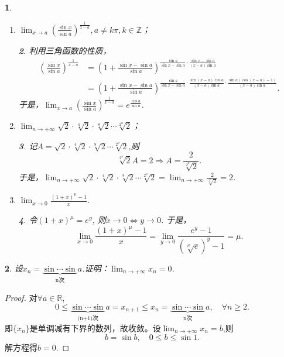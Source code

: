 \documentclass[utf8]{book}
\newtheorem{example}{}[section]             %
\newtheorem{solution}{}
\begin{document}
\begin{example}
\begin{enumerate}
\begin{solution}
\begin{equation*}
\begin{split}
&=\displaystyle\lim_{x\to 0}(1+2(e^{\frac{x}{1+x}}-1))^{\frac{1}{2(e^{\frac{x}{1+x}}-1)}\frac{2(e^{\frac{x}{1+x}}-1)}{\frac{x}{1+x}}\left(\frac{x^2+1}{1+x}\right)}\\
&=e^2
\end{split}
\end{equation*}
\end{solution}
\item $\displaystyle\lim_{x\to a}\left(\frac{\sin{x}}{\sin{a}}\right)^{\frac{1}{x-a}}, a\neq k\pi,k\in\mathbb{Z}$；
\begin{solution}利用三角函数的性质，
\begin{equation*}
\begin{split}
\left(\frac{\sin{x}}{\sin{a}}\right)^{\frac{1}{x-a}}&=\left(1+\frac{\sin{x}-\sin{a}}{\sin{a}}\right)^{\frac{\sin{a}}{\sin{x}-\sin{a}}\cdot \frac{\sin{x}-\sin{a}}{(x-a)\sin{a}}}\\
&=\left(1+\frac{\sin{x}-\sin{a}}{\sin{a}}\right)^{\frac{\sin{a}}{\sin{x}-\sin{a}}\cdot \frac{\sin(x-a)\cos{a}}{(x-a)\sin{a}}\cdot\frac{\sin{a}(\cos(x-a)-1)}{(x-a)\sin{a}}}.
\end{split}
\end{equation*}
于是，$\displaystyle\lim_{x\to a}\left(\frac{\sin{x}}{\sin{a}}\right)^{\frac{1}{x-a}}=e^{\frac{\cos{a}}{\sin{a}}}$.
\end{solution}
\item $\displaystyle\lim_{n\to +\infty}\sqrt{2}\cdot\sqrt[4]{2}\cdot\sqrt[8]{2}\cdots\sqrt[2^n]{2}$；
\begin{solution}记$A=\sqrt{2}\cdot\sqrt[4]{2}\cdot\sqrt[8]{2}\cdots\sqrt[2^n]{2}$,则$$\sqrt[2^n]{2}A=2\Rightarrow A = \frac{2}{\sqrt[2^n]{2}}.$$
于是，$\displaystyle\lim_{n\to +\infty}\sqrt{2}\cdot\sqrt[4]{2}\cdot\sqrt[8]{2}\cdots\sqrt[2^n]{2} = \displaystyle\lim_{n\to +\infty}\frac{2}{\sqrt[2^n]{2}} = 2$.
\end{solution}
\item $\displaystyle\lim_{x\to 0}\frac{(1+x)^{\mu} - 1}{x}$.
\begin{solution}
令$(1+x)^{\mu} = e^y$, 则$x\to 0\iff y\to 0$.
于是，
$$\displaystyle\lim_{x\to 0}\frac{(1+x)^{\mu} - 1}{x}=\displaystyle\lim_{y\to 0}\frac{e^y-1}{(\sqrt[\mu]{e})^y-1}=\mu.$$
\end{solution}
\end{enumerate}
\end{example}
\begin{example}
设$x_n=\underbrace{\sin\cdots\sin}_{\text{n次}}{a}$.证明：$\displaystyle\lim_{n\to +\infty}x_n=0$.
\end{example}
\begin{proof}对$\forall a\in\mathbb{R}$, $$0\leq\underbrace{\sin\cdots\sin}_{\text{(n+1)次}}{a}=x_{n+1} \leq x_{n}=\underbrace{\sin\cdots\sin}_{\text{n次}}{a},\quad \forall n\geq 2.$$
即$\{x_n\}$是单调减有下界的数列，故收敛。设$\displaystyle\lim_{n\to +\infty}x_n=b$,则
$$b=\sin{b},\quad 0\leq b\leq \sin{1}.$$
解方程得$b=0$.
\end{proof}
\end{document}
